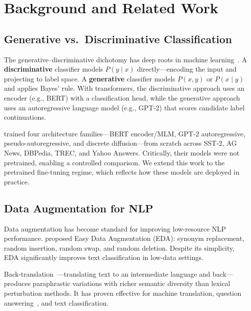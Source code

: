 \documentclass[11pt,a4paper,twocolumn]{article}
\begin{document}
\section{Background and Related Work}

\subsection{Generative vs.\ Discriminative Classification}

The generative--discriminative dichotomy has deep roots in machine learning~\cite{ng2002}. A \textbf{discriminative} classifier models $P(y \mid x)$ directly---encoding the input and projecting to label space. A \textbf{generative} classifier models $P(x, y)$ or $P(x \mid y)$ and applies Bayes' rule. With transformers, the discriminative approach uses an encoder (e.g., BERT) with a classification head, while the generative approach uses an autoregressive language model (e.g., GPT-2) that scores candidate label continuations.

\cite{kasa2025} trained four architecture families---BERT encoder/MLM, GPT-2 autoregressive, pseudo-autoregressive, and discrete diffusion---from scratch across SST-2, AG News, DBPedia, TREC, and Yahoo Answers. Critically, their models were not pretrained, enabling a controlled comparison. We extend this work to the pretrained fine-tuning regime, which reflects how these models are deployed in practice.

\subsection{Data Augmentation for NLP}

Data augmentation has become standard for improving low-resource NLP performance. \cite{wei2019} proposed Easy Data Augmentation (EDA): synonym replacement, random insertion, random swap, and random deletion. Despite its simplicity, EDA significantly improves text classification in low-data settings.

Back-translation~\cite{sennrich2016}---translating text to an intermediate language and back---produces paraphrastic variations with richer semantic diversity than lexical perturbation methods. It has proven effective for machine translation, question answering~\cite{yu2018}, and text classification.
\end{document}
